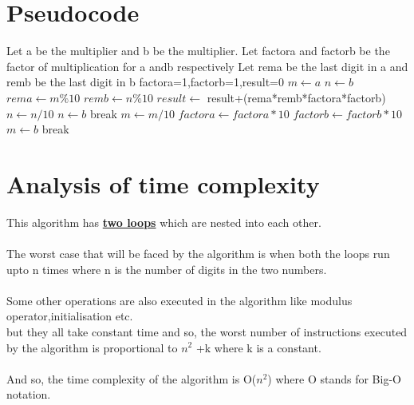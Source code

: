 \documentclass[10pt,a4paper]{article}
\begin{document}
\newpage
\vspace{4cm}
\section{Pseudocode}
\begin{algorithm}
\begin{algorithmic}
\large
\STATE Let a be the multiplier and b be the multiplier.
\STATE Let factora and factorb be the factor of multiplication for a andb respectively 
\STATE Let rema be the last digit in a and remb be the last digit in b
\STATE factora=1,factorb=1,result=0
\STATE $ m \leftarrow a$
\STATE $n \leftarrow b$
\STATE $rema \leftarrow m \% 10$
\STATE   $remb \leftarrow n\%10$
\STATE  $result \leftarrow$ result+(rema*remb*factora*factorb)
\STATE  $n \leftarrow n/10$
\STATE $n \leftarrow b$
\STATE break
\ENDIF
\ENDWHILE
\STATE $ m \leftarrow m/10 $
\STATE $factora \leftarrow factora*10$
\STATE $factorb \leftarrow factorb*10$
\STATE  $m \leftarrow b$
\STATE break
\ENDIF
\ENDWHILE
\end{algorithmic}
\end{algorithm}
\newpage

\section{Analysis of time complexity}
\large This algorithm has \textbf{\underline{two loops}} which are nested into each other.
\\
\\
The worst case that will be faced by the algorithm is when both the loops run upto n times where n is the number of digits in the
two numbers.
\\
\\
Some other operations are also executed in the algorithm like modulus operator,initialisation etc.
\\
 but they all take constant time and so, the worst number of instructions executed by the algorithm
is proportional to $n^2$ +k where k is a constant.
\\
\\
And so, the time complexity of the algorithm is O($n^2$) where O stands for Big-O notation.
\end{document}
